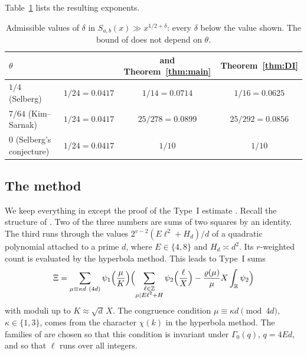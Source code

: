 \documentclass[11pt]{amsart}
\theoremstyle{remark}
\theoremstyle{definition}
\numberwithin{equation}{section}
\newcommand{\Z}{\mathbb{Z}}
\newcommand{\R}{\mathbb{R}}
\begin{document}
Table~\ref{tab:exponents} lists the resulting exponents.

\begin{table}[h]
\centering
\begin{tabular}{lccc}
\toprule
$\theta$ & \cite{I} & \cite{II} and Theorem~\ref{thm:main} & Theorem~\ref{thm:DI}\\
\midrule
$1/4$ (Selberg) & $1/24=0.0417$ & $1/14=0.0714$ & $1/16=0.0625$\\
$7/64$ (Kim--Sarnak) & $1/24=0.0417$ & $25/278=0.0899$ & $25/292=0.0856$\\
$0$ (Selberg's conjecture) & $1/24=0.0417$ & $1/10$ & $1/10$\\
\bottomrule
\end{tabular}
\caption{Admissible values of $\delta$ in $S_{a,b}(x)\gg x^{1/2+\delta}$: every $\delta$ below the value shown. The bound of \cite{I} does not depend on $\theta$.}
\label{tab:exponents}
\end{table}

\subsection{The method}
We keep everything in \cite{II} except the proof of the Type~I estimate \cite[Proposition~6.5]{II}. Recall the structure of \cite{II}. Two of the three numbers are sums of two squares by an identity. The third runs through the values $2^{v-2}(E\ell^2+H_d)/d$ of a quadratic polynomial attached to a prime $d$, where $E\in\{4,8\}$ and $H_d\asymp d^2$. Its $r$-weighted count is evaluated by the hyperbola method. This leads to Type~I sums
\[
\Xi=\sum_{\mu\equiv\kappa d\ (4d)}\psi_1\Bigl(\frac\mu K\Bigr)\Bigl(\sum_{\substack{\ell\in\Z\\ \mu\mid E\ell^2+H}}\psi_2\Bigl(\frac\ell X\Bigr)-\frac{\varrho(\mu)}{\mu}X\int_\R\psi_2\Bigr)
\]
with moduli up to $K\approx\sqrt{d}\,X$. The congruence condition $\mu\equiv\kappa d\pmod{4d}$, $\kappa\in\{1,3\}$, comes from the character $\chi(k)$ in the hyperbola method. The families of \cite{II} are chosen so that this condition is invariant under $\Gamma_0(q)$, $q=4Ed$, and so that $\ell$ runs over all integers.
\end{document}
